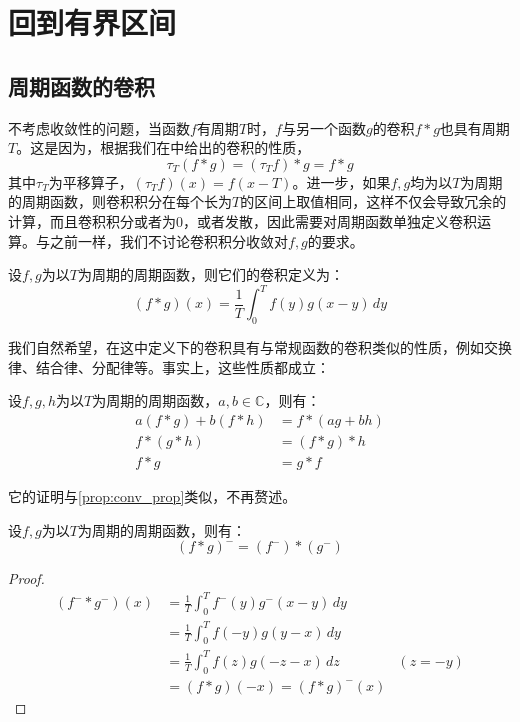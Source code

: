 \section{回到有界区间}\label{sec:Finite_Interval}

\subsection{周期函数的卷积}\label{sub:conv_of_period_func}

不考虑收敛性的问题，当函数$f$有周期$T$时，$f$与另一个函数$g$的卷积$f*g$也具有周期$T$。这是因为，根据我们在中给出的卷积的性质，
\[\tau_T(f*g)=(\tau_T f)*g=f*g\]
其中$\tau_T$为平移算子，$(\tau_T f)(x)=f(x-T)$。进一步，如果$f,g$均为以$T$为周期的周期函数，则卷积积分在每个长为$T$的区间上取值相同，这样不仅会导致冗余的计算，而且卷积积分或者为0，或者发散，因此需要对周期函数单独定义卷积运算。与之前一样，我们不讨论卷积积分收敛对$f,g$的要求。

\begin{definition}[周期函数的卷积]\label{def:period_conv}
    设$f,g$为以$T$为周期的周期函数，则它们的卷积定义为：
    \[(f*g)(x)=\frac{1}{T}\int_{0}^{T}f(y)g(x-y)\,dy\]
\end{definition}

我们自然希望，在这中定义下的卷积具有与常规函数的卷积类似的性质，例如交换律、结合律、分配律等。事实上，这些性质都成立：
\begin{proposition}
    设$f,g,h$为以$T$为周期的周期函数，$a,b\in\mathbb{C}$，则有：
    \begin{align*}
        a(f*g)+b(f*h)&=f*(ag+bh)\\
        f*(g*h)&=(f*g)*h\\
        f*g&=g*f
    \end{align*}    
\end{proposition}
它的证明与\cref{prop:conv_prop}类似，不再赘述。

\begin{proposition}[信号反转]
    设$f,g$为以$T$为周期的周期函数，则有：
    \[(f*g)^-=(f^-)*(g^-)\]
\end{proposition}
\begin{proof}
    \begin{align*}
        (f^-*g^-)(x)&=\frac{1}{T}\int_0^{T}f^-(y)g^-(x-y)\,dy\\
        &=\frac{1}{T}\int_0^{T}f(-y)g(y-x)\,dy\\
        &=\frac{1}{T}\int_0^{T}f(z)g(-z-x)\,dz&(z=-y)\\
        &=(f*g)(-x)=(f*g)^-(x)
    \end{align*}
\end{proof}

